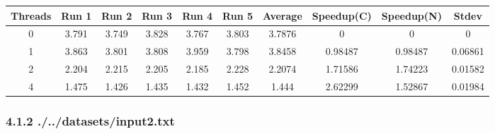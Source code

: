 \begin{itemize}
\begin{center}
 \begin{adjustbox}{width=\columnwidth, center} 
 \begin{tabular}{ | |c | c c c c c | c | c c | c | |} \hline 
 Threads & Run 1 & Run 2 & Run 3 & Run 4 & Run 5 & Average & Speedup(C) & Speedup(N) & Stdev \\ [0.5ex] 
 \hline 
 \hline 
0& 3.791 & 3.749 & 3.828 & 3.767 & 3.803 & 3.7876 & 0 & 0 & 0\\ 
 \hline
1& 3.863 & 3.801 & 3.808 & 3.959 & 3.798 & 3.8458 & 0.98487 & 0.98487 & 0.06861\\ 
 \hline
2& 2.204 & 2.215 & 2.205 & 2.185 & 2.228 & 2.2074 & 1.71586 & 1.74223 & 0.01582\\ 
 \hline
4& 1.475 & 1.426 & 1.435 & 1.432 & 1.452 & 1.444 & 2.62299 & 1.52867 & 0.01984\\ 
 \hline
\end{tabular} \end{adjustbox} \end{center}\end{itemize}\subsubsection*{4.1.2 ./../datasets/input2.txt} 
